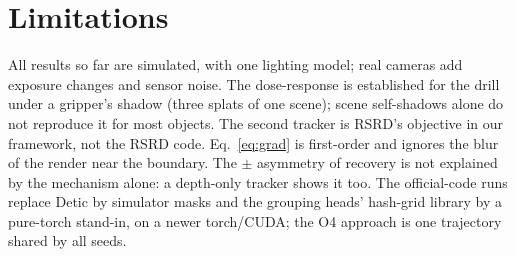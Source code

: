 \documentclass[conference]{IEEEtran}
\begin{document}
\section{Limitations}
All results so far are simulated, with one lighting model; real cameras add exposure changes and sensor noise. The
dose-response is established for the drill under a gripper's shadow (three splats of one scene); scene self-shadows
alone do not reproduce it for most objects.
The second tracker is RSRD's objective in our framework, not the RSRD code. Eq.~\eqref{eq:grad} is first-order and
ignores the blur of the render near the boundary. The $\pm$ asymmetry of recovery is not explained by the mechanism
alone: a depth-only tracker shows it too. The official-code runs replace Detic by simulator masks and the grouping
heads' hash-grid library by a pure-torch stand-in, on a newer torch/CUDA; the O4 approach is one trajectory shared by
all seeds.



\end{document}
